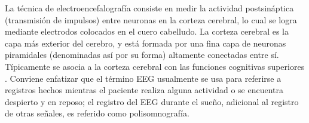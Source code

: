 \documentclass[12pt,letterpaper]{book}
\begin{document}
%
%
%

La técnica de electroencefalografía consiste en medir la actividad postsináptica (transmisión de impulsos) entre neuronas en la corteza cerebral, lo cual se logra mediante electrodos colocados en el cuero cabelludo.
%
La corteza cerebral es la capa más exterior del cerebro, y está formada por una fina capa de neuronas piramidales (denominadas así por su forma) altamente conectadas entre sí.
%
Típicamente se asocia a la corteza cerebral con las funciones cognitivas superiores \cite{niedermeyer}.
%
Conviene enfatizar que el término EEG usualmente se usa para referirse a registros hechos mientras el paciente realiza alguna actividad o se encuentra despierto y en reposo; el registro del EEG durante el sueño, adicional al registro de otras señales, es referido como polisomnografía.

\end{document}
